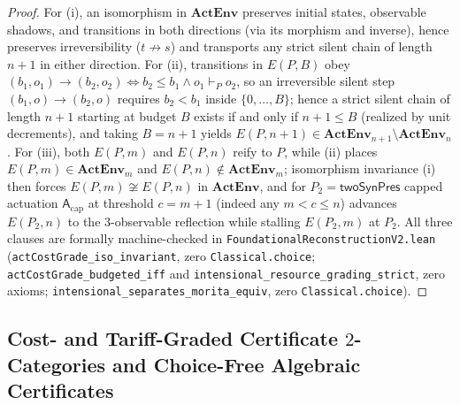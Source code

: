 \documentclass[11pt]{article}
\theoremstyle{plain}
\theoremstyle{definition}
\begin{document}
\begin{proof}
For (i), an isomorphism in $\mathbf{ActEnv}$ preserves initial states, observable shadows, and transitions in both directions (via its morphism and inverse), hence preserves irreversibility ($t \not\to s$) and transports any strict silent chain of length $n+1$ in either direction. For (ii), transitions in $E(P, B)$ obey $(b_1, o_1) \to (b_2, o_2) \iff b_2 \le b_1 \wedge o_1 \vdash_P o_2$, so an irreversible silent step $(b_1, o) \to (b_2, o)$ requires $b_2 < b_1$ inside $\{0,\dots,B\}$; hence a strict silent chain of length $n+1$ starting at budget $B$ exists if and only if $n + 1 \le B$ (realized by unit decrements), and taking $B = n + 1$ yields $E(P, n+1) \in \mathbf{ActEnv}_{n+1} \setminus \mathbf{ActEnv}_n$. For (iii), both $E(P, m)$ and $E(P, n)$ reify to $P$, while (ii) places $E(P, m) \in \mathbf{ActEnv}_m$ and $E(P, n) \notin \mathbf{ActEnv}_m$; isomorphism invariance (i) then forces $E(P, m) \not\cong E(P, n)$ in $\mathbf{ActEnv}$, and for $P_2 = \mathsf{twoSynPres}$ capped actuation $\mathsf{A}_{\mathrm{cap}}$ at threshold $c = m + 1$ (indeed any $m < c \le n$) advances $E(P_2, n)$ to the $3$-observable reflection while stalling $E(P_2, m)$ at $P_2$. All three clauses are formally machine-checked in \texttt{FoundationalReconstructionV2.lean} (\texttt{actCostGrade\_\allowbreak iso\_\allowbreak invariant}, zero \texttt{Classical.choice}; \texttt{actCostGrade\_\allowbreak budgeted\_\allowbreak iff} and \texttt{intensional\_\allowbreak resource\_\allowbreak grading\_\allowbreak strict}, zero axioms; \texttt{intensional\_\allowbreak separates\_\allowbreak morita\_\allowbreak equiv}, zero \texttt{Classical.choice}).
\end{proof}

\subsection{Cost- and Tariff-Graded Certificate \texorpdfstring{$2$-Categories}{2-Categories} and Choice-Free Algebraic Certificates}\label{sec:cert-2cat-adequacy}
\end{document}
